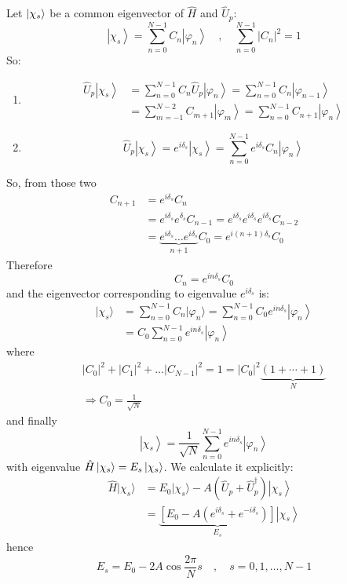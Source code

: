 \documentclass[12pt]{article}
\newcommand{\be}{\begin{equation}}
\newcommand{\ee}{\end{equation}}
\begin{document}
Let $\ket{\chi_s}$ be a common eigenvector of $\hat{H}$ and $\hat{U}_p$:
\be
\left|\chi_s\right\rangle=\sum_{n=0}^{N-1} C_{n}\left|\varphi_{n}\right\rangle
\quad,\quad
\sum_{n=0}^{N-1}\left|C_{n}\right|^{2}=1
\ee
So:
\begin{enumerate}
\item %
\be
\begin{aligned} 
\hat{U}_{p}\left|\chi_{s}\right\rangle 
&=\sum_{n=0}^{N-1} C_{n} \hat{U}_{p}\left|\varphi_{n}\right\rangle
=\sum_{n=0}^{N-1} C_{n}\left|\varphi_{n-1}\right\rangle \\ &=\sum_{m=-1}^{N-2} C_{m+1}\left|\varphi_{m}\right\rangle
=\sum_{n=0}^{N-1} C_{n+1}\left|\varphi_{n}\right\rangle \end{aligned}
\ee
\item%
\[
\hat{U}_{p}\left|\chi_{s}\right\rangle=e^{i \delta_{s}}\left|\chi_{s}\right\rangle=\sum_{n=0}^{N-1} e^{i \delta_{s}} C_{n}\left|\varphi_{n}\right\rangle
\]
\end{enumerate}
%
So, from those two 
\be
\begin{aligned}
C_{n+1} &= e^{i\delta_s} C_n\\
&=e^{i \delta_{s}}e^{\delta_{s}}C_{n-1}
=e^{i \delta_{s}} e^{i \delta_{s}} e^{i \delta_{s}} C_{n-2}\\
&=\underbrace{e^{i \delta_{s}} \ldots e^{i \delta_{s}}}%
_{n+1}  C_{0}=e^{i(n+1) \delta_{s}} C_{0}
\end{aligned}
\ee
Therefore
\be
C_{n}=e^{i n \delta_{s}} C_{0}
\ee
and the eigenvector corresponding to
eigenvalue $e^{i\delta_s}$ is:
\[
\begin{aligned}
|\chi_{s}\rangle &=\sum_{n=0}^{N-1} C_{n} 
|\varphi_{n}\rangle=\sum_{n=0}^{N-1} C_{0} e^{i n \delta_{s}}\left|\varphi_{n}\right\rangle \\ &=C_{0} \sum_{n=0}^{N-1} e^{i n \delta_{s}}\left|\varphi_{n}\right\rangle 
\end{aligned}
\]
where
\be
\begin{gathered}
|C_{0}|^{2}+|C_{1}|^{2}+\ldots\left|C_{N-1}\right|^{2}=1=\left|C_{0}\right|^{2} \underbrace{(1+\cdots+1)}_{N}\\
\Rightarrow C_0 = \frac{1}{\sqrt{N}}
\end{gathered}
\ee
and finally
\be
\boxed{
\left|\chi_{s}\right\rangle=\frac{1}{\sqrt{N}} \sum_{n=0}^{N-1} e^{i n \delta_{s}}\left|\varphi_{n}\right\rangle
}
\ee
with eigenvalue $\hat{H}\ket{\chi_s} = E_s\ket{\chi_s}$.
We calculate it explicitly:
\be
\begin{aligned} 
\hat{H}|\chi_s\rangle 
&=E_{0}|\chi_s\rangle-
A\left(\hat{U}_{p}+\hat{U}_{p}^{\dagger}\right)\left|\chi_s\right\rangle \\ 
&=\underbrace{\left[E_{0}-A\left(e^{i \delta_{s}}+e^{-i \delta_{s}}\right)\right]}%
_{E_{s}}
\left|\chi_s\right\rangle
\end{aligned}
\ee
hence
\[
\boxed{
E_{s}=E_{0}-2 A \cos \frac{2 \pi}{N} s
}
\quad,\quad s=0,1,\ldots,N-1
\]
\end{document}
